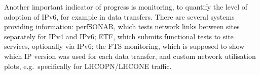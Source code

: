 Another important indicator of progress is monitoring, to quantify the level
of adoption of IPv6, for example in data transfers. There are several systems
providing information: perfSONAR, which tests network links between sites
separately for IPv4 and IPv6; ETF, which submits functional tests to site
services, optionally via IPv6; the FTS monitoring, which is supposed to show
which IP version was used for each data transfer, and custom network
utilisation plots, e.g.\ specifically for LHCOPN/LHCONE traffic.

